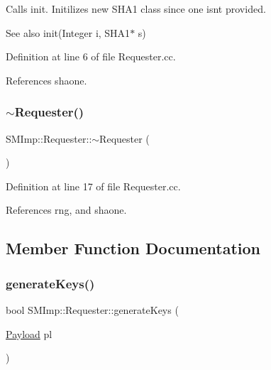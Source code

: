 Calls init. Initilizes new S\+H\+A1 class since one isn\textquotesingle{}t provided. \begin{DoxySeeAlso}{See also}
init(\+Integer i, S\+H\+A1$\ast$ s) 
\end{DoxySeeAlso}


Definition at line 6 of file Requester.\+cc.



References shaone.

\mbox{\label{classSMImp_1_1Requester_a2ba23cedf593171733290231dd4147c9}} 
\subsubsection{\texorpdfstring{$\sim$\+Requester()}{~Requester()}}
{\footnotesize\ttfamily S\+M\+Imp\+::\+Requester\+::$\sim$\+Requester (\begin{DoxyParamCaption}{ }\end{DoxyParamCaption})}



Definition at line 17 of file Requester.\+cc.



References rng, and shaone.



\subsection{Member Function Documentation}
\mbox{\label{classSMImp_1_1Requester_ab284de7cb9eb32ae06d4f4359023d82b}} 
\subsubsection{\texorpdfstring{generate\+Keys()}{generateKeys()}}
{\footnotesize\ttfamily bool S\+M\+Imp\+::\+Requester\+::generate\+Keys (\begin{DoxyParamCaption}\item[{\hyperlink{structSMImp_1_1Payload}{Payload}}]{pl }\end{DoxyParamCaption})}

